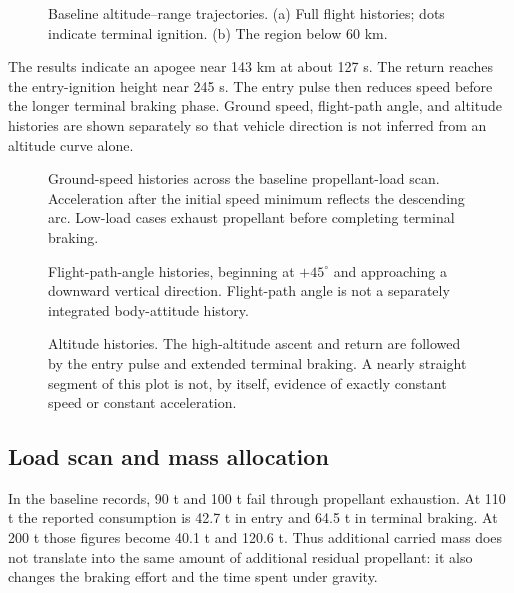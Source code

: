 \documentclass[11pt,a4paper]{article}
\begin{document}
\begin{figure}[htbp]
\centering\SourceTrajectory
\caption{Baseline altitude--range trajectories. (a) Full flight histories; dots indicate terminal ignition. (b) The region below 60 km.}
\label{fig:trajectory}
\end{figure}

The results indicate an apogee near 143 km at about 127 s. The return reaches the entry-ignition height near 245 s. The entry pulse then reduces speed before the longer terminal braking phase. Ground speed, flight-path angle, and altitude histories are shown separately so that vehicle direction is not inferred from an altitude curve alone.

\begin{figure}[htbp]
\centering{}
\caption{Ground-speed histories across the baseline propellant-load scan. Acceleration after the initial speed minimum reflects the descending arc. Low-load cases exhaust propellant before completing terminal braking.}
\label{fig:speed}
\end{figure}

\begin{figure}[htbp]
\centering{}
\caption{Flight-path-angle histories, beginning at $+45^\circ$ and approaching a downward vertical direction. Flight-path angle is not a separately integrated body-attitude history.}
\label{fig:gamma}
\end{figure}

\begin{figure}[htbp]
\centering{}
\caption{Altitude histories. The high-altitude ascent and return are followed by the entry pulse and extended terminal braking. A nearly straight segment of this plot is not, by itself, evidence of exactly constant speed or constant acceleration.}
\label{fig:height}
\end{figure}

\subsection{Load scan and mass allocation}


In the baseline records, 90 t and 100 t fail through propellant exhaustion. At 110 t the reported consumption is 42.7 t in entry and 64.5 t in terminal braking. At 200 t those figures become 40.1 t and 120.6 t. Thus additional carried mass does not translate into the same amount of additional residual propellant: it also changes the braking effort and the time spent under gravity.
\end{document}
